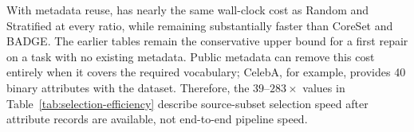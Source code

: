 With metadata reuse, \model has nearly the same wall-clock cost as Random and Stratified at every ratio, while remaining substantially faster than CoreSet and BADGE. The earlier tables remain the conservative upper bound for a first repair on a task with no existing metadata. Public metadata can remove this cost entirely when it covers the required vocabulary; CelebA, for example, provides 40 binary attributes with the dataset. Therefore, the $39$--$283\times$ values in Table~\ref{tab:selection-efficiency} describe source-subset selection speed after attribute records are available, not end-to-end pipeline speed.
